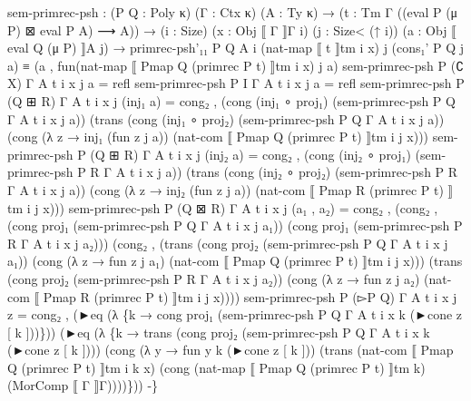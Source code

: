 \begin{code}
{sem{-}primrec{-}psh : (P Q : Poly κ) (Γ : Ctx κ) (A : Ty κ)
  → (t : Tm Γ ((eval P (μ P) ⊠ eval P A) ⟶ A))
  → (i : Size) (x : Obj ⟦ Γ ⟧Γ i) (j : Size< (↑ i)) (a : Obj ⟦ eval Q (μ P) ⟧A j)
  → primrec{-}psh'₁₁ P Q A i (nat{-}map ⟦ t ⟧tm i x) j (cons₁' P Q j a) ≡ (a , fun(nat{-}map ⟦ Pmap Q (primrec P t) ⟧tm i x) j a)
sem{-}primrec{-}psh P (∁ X) Γ A t i x j a = refl
sem{-}primrec{-}psh P I Γ A t i x j a = refl
sem{-}primrec{-}psh P (Q ⊞ R) Γ A t i x j (inj₁ a) =
  cong₂ \AgdaUnderscore{},\AgdaUnderscore{} (cong (inj₁ ∘ proj₁) (sem{-}primrec{-}psh P Q Γ A t i x j a))
            (trans (cong (inj₁ ∘ proj₂) (sem{-}primrec{-}psh P Q Γ A t i x j a))
                   (cong (λ z → inj₁ (fun z j a)) (nat{-}com ⟦ Pmap Q (primrec P t) ⟧tm i j x)))
sem{-}primrec{-}psh P (Q ⊞ R) Γ A t i x j (inj₂ a) =
  cong₂ \AgdaUnderscore{},\AgdaUnderscore{} (cong (inj₂ ∘ proj₁) (sem{-}primrec{-}psh P R Γ A t i x j a))
            (trans (cong (inj₂ ∘ proj₂) (sem{-}primrec{-}psh P R Γ A t i x j a))
                   (cong (λ z → inj₂ (fun z j a)) (nat{-}com ⟦ Pmap R (primrec P t) ⟧tm i j x)))
sem{-}primrec{-}psh P (Q ⊠ R) Γ A t i x j (a₁ , a₂) =
  cong₂ \AgdaUnderscore{},\AgdaUnderscore{} (cong₂ \AgdaUnderscore{},\AgdaUnderscore{} (cong proj₁ (sem{-}primrec{-}psh P Q Γ A t i x j a₁))
                       (cong proj₁ (sem{-}primrec{-}psh P R Γ A t i x j a₂)))
            (cong₂ \AgdaUnderscore{},\AgdaUnderscore{} (trans (cong proj₂ (sem{-}primrec{-}psh P Q Γ A t i x j a₁))
                              (cong (λ z → fun z j a₁) (nat{-}com ⟦ Pmap Q (primrec P t) ⟧tm i j x)))
                       (trans (cong proj₂ (sem{-}primrec{-}psh P R Γ A t i x j a₂))
                              (cong (λ z → fun z j a₂) (nat{-}com ⟦ Pmap R (primrec P t) ⟧tm i j x))))
sem{-}primrec{-}psh P (▻P Q) Γ A t i x j z =
  cong₂ \AgdaUnderscore{},\AgdaUnderscore{}
        (►eq (λ \{k → cong proj₁ (sem{-}primrec{-}psh P Q Γ A t i x k (►cone z [ k ]))\}))
        (►eq (λ \{k → trans (cong proj₂ (sem{-}primrec{-}psh P Q Γ A t i x k (►cone z [ k ])))
                           (cong (λ y → fun y k (►cone z [ k ]))
                                 (trans (nat{-}com ⟦ Pmap Q (primrec P t) ⟧tm i k x)
                                        (cong (nat{-}map ⟦ Pmap Q (primrec P t) ⟧tm k) (MorComp ⟦ Γ ⟧Γ))))\}))
{-}\}}\<%
\\
%
\\[\AgdaEmptyExtraSkip]%
\>[0]\AgdaSpace{}%
\AgdaSymbol{:}\AgdaSpace{}%
\AgdaSymbol{(}\AgdaSpace{}%
\AgdaSpace{}%
\AgdaSymbol{:}\AgdaSpace{}%
\AgdaSpace{}%

\end{code}
